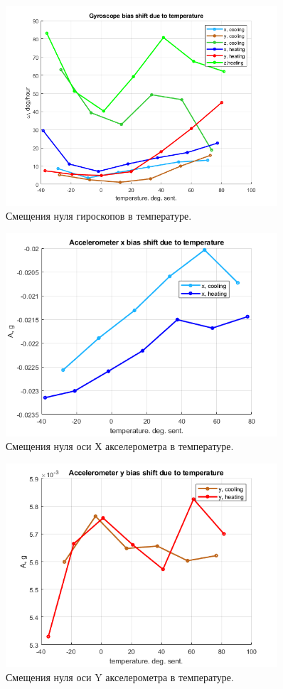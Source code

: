 \documentclass[a4paper,12pt]{article}
\begin{document}
\begin{figure}
\centering
\includegraphics[width=0.9\textwidth]{gyro_bias_steps3.png} 
\caption{\label{fig:gyro_bias_steps} Смещения нуля гироскопов в температуре.}
\end{figure}
\begin{figure}
\centering
\includegraphics[width=0.9\textwidth]{Ax_accel.png} 
\caption{\label{fig:Ax_accel} Смещения нуля оси Х акселерометра в температуре.}
\end{figure}
\begin{figure}
\centering
\includegraphics[width=0.9\textwidth]{Ay_accel.png} 
\caption{\label{fig:Ay_accel} Смещения нуля оси Y акселерометра в температуре.}
\end{figure}
\end{document}
